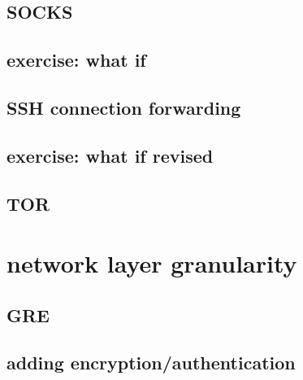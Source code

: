 \subsection{SOCKS}


\subsection{exercise: what if}


\subsection{SSH connection forwarding}


\subsection{exercise: what if revised}


\subsection{TOR}

\section{network layer granularity}




\subsection{GRE}



\subsection{adding encryption/authentication}


